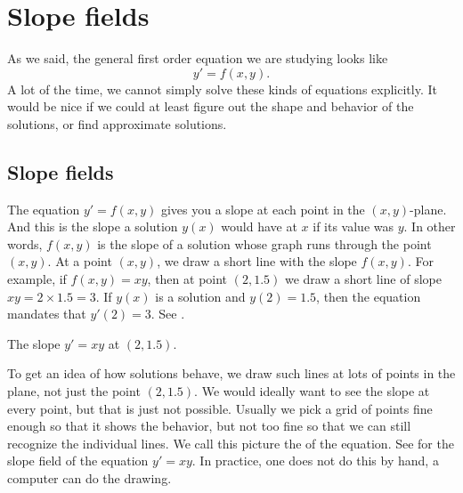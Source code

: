
\sectionnewpage
\section{Slope fields}
\label{slopefields:section}



%

As we said, the general first order equation we are studying looks like
\begin{equation*}
y' = f(x,y).
\end{equation*}
A lot of the time, we cannot simply solve these kinds of equations explicitly.
It would be nice if we could at least figure out the shape and behavior of
the solutions, or find approximate solutions.

\subsection{Slope fields}

The equation $y' = f(x,y)$
gives you a slope at each point 
in the
$(x,y)$-plane.  And this is the slope a solution $y(x)$ would have 
at $x$ if its value was $y$.  In other words, $f(x,y)$ is the slope
of a solution whose graph runs through the
point $(x,y)$.  At a point $(x,y)$, we draw a short line
with the slope $f(x,y)$.
For example, if $f(x,y) = xy$, then at point $(2,1.5)$ we draw a
short line of slope $xy = 2 \times 1.5 = 3$.  If $y(x)$ is a solution
and $y(2) = 1.5$, then the equation mandates that $y'(2) = 3$.
See .

\begin{myfig}
\capstart
{}
\caption{The slope $y'=xy$ at $(2,1.5)$.\label{1.3:fig0}}
\end{myfig}

To get an idea of how solutions behave, we draw such lines at lots
of points in the plane, not just the point $(2,1.5)$.  We would
ideally want to see the slope at every point, but that is
just not possible.  Usually we pick a
grid of points fine enough so that it shows the behavior, but not too
fine so that we can still recognize the individual lines.
We call this picture the \emph{} of the equation.
See  for the slope field of the equation $y' = xy$.
In practice, one does not do this by hand, a computer can do the
drawing.

